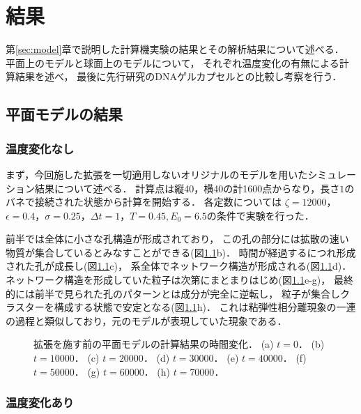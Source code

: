 \chapter{結果}
\label{sec:result}

第\ref{sec:model}章で説明した計算機実験の結果とその解析結果について述べる．
平面上のモデルと球面上のモデルについて，
それぞれ温度変化の有無による計算結果を述べ，
最後に先行研究のDNAゲルカプセルとの比較し考察を行う．

\section{平面モデルの結果}

\subsection{温度変化なし}

まず，今回施した拡張を一切適用しないオリジナルのモデルを用いたシミュレーション結果について述べる．
計算点は縦40，横40の計1600点からなり，長さ$1$のバネで接続された状態から計算を開始する．
各定数については
$\zeta=12000$，$\epsilon=0.4$，$\sigma=0.25$，$\Delta t=1$，$T=0.45, E_0=6.5$の条件で実験を行った．

前半では全体に小さな孔構造が形成されており，
この孔の部分には拡散の速い物質が集合しているとみなすことができる(図\ref{fig:result_2d_without_anearing}b)．
時間が経過するにつれ形成された孔が成長し(図\ref{fig:result_2d_without_anearing}c)，
系全体でネットワーク構造が形成される(図\ref{fig:result_2d_without_anearing}d)．
ネットワーク構造を形成していた粒子は次第にまとまりはじめ(図\ref{fig:result_2d_without_anearing}e-g)，
最終的には前半で見られた孔のパターンとは成分が完全に逆転し，
粒子が集合しクラスターを構成する状態で安定となる(図\ref{fig:result_2d_without_anearing}h)．
これは粘弾性相分離現象の一連の過程と類似しており，元のモデルが表現していた現象である．

\begin{figure}
\centering

\caption{
    拡張を施す前の平面モデルの計算結果の時間変化．
    (a) $t=0$．
    (b) $t=10000$．
    (c) $t=20000$．
    (d) $t=30000$．
    (e) $t=40000$．
    (f) $t=50000$．
    (g) $t=60000$．
    (h) $t=70000$．
}
\label{fig:result_2d_without_anearing}
\end{figure}

\subsection{温度変化あり}

